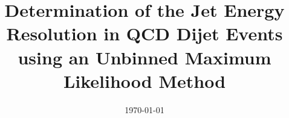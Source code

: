 \documentclass[a4paper]{cmspaper} %
\begin{document}
\begin{titlepage}
  \date{\today}
  \title{Determination of the Jet Energy Resolution in QCD Dijet
    Events using an Unbinned Maximum Likelihood Method}
\end{titlepage}
\tableofcontents













\end{document}
